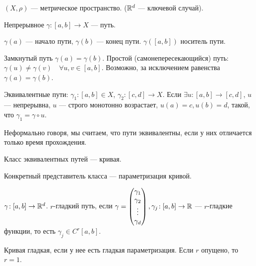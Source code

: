 \begin{definition}
    $(X, \rho)$ --- метрическое пространство.  ($\mathbb{R}^d$ --- ключевой случай).

    Непрерывное $\gamma\!: [a,b] \to X$ --- путь.

     $\gamma(a)$ --- начало пути,  $\gamma(b)$ --- конец пути.  $\gamma([a, b])$ носитель пути.

     Замкнутый путь  $\gamma(a) = \gamma(b)$. Простой (самонепересекающийся) путь:  $\gamma(u) \neq \gamma(v) \quad \forall u, v \in [a, b]$. Возможно, за исключением равенства  $\gamma(a) = \gamma(b)$.
\end{definition}
\begin{definition}
    Эквивалентные пути: $\gamma_1\!:[a, b] \in X$, $\gamma_2\!: [c,d] \to X$. Если  $\exists u\!:[a, b] \to [c, d]$,  $u$ --- непрерывна,  $u$ --- строго монотонно возрастает,  $u(a) = c, u(b) = d$, такой, что  $\gamma_1 = \gamma \circ u$.

    Неформально говоря, мы считаем, что пути эквивалентны, если у них отличается только время прохождения.
\end{definition}
\begin{definition}
    Класс эквивалентных путей --- кривая.

    Конкретный представитель класса --- параметризация кривой.
\end{definition}
\begin{definition}
    $\gamma\!: [a,b] \to \mathbb{R}^d$.  $r$-гладкий путь, если  $\gamma = \begin{pmatrix} \gamma_1 \\ \gamma_2 \\ \vdots \\ \gamma_d \end{pmatrix}, \gamma_j\!:[a,b] \to \mathbb{R}$ --- $r$-гладкие функции, то есть  $\gamma_j \in C^r[a,b]$.

    Кривая гладкая, если у нее есть гладкая параметризация. Если  $r$ опущено, то  $r=1$.
\end{definition}
